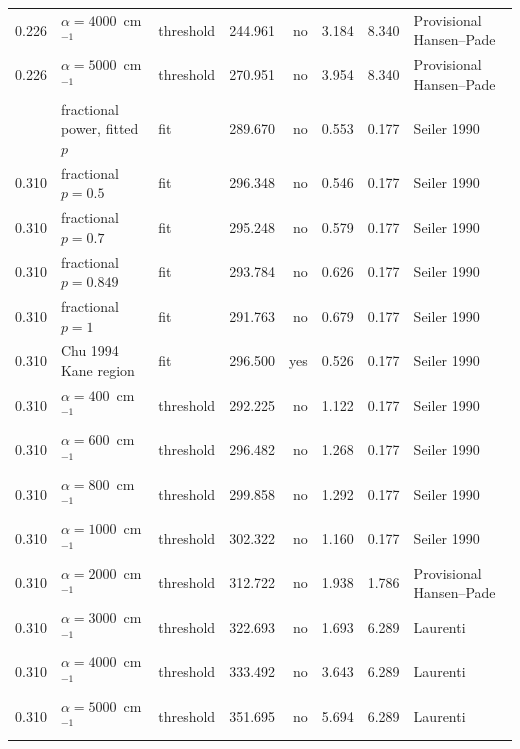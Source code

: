 \begin{landscape}
\begin{longtable}{@{}rp{1.70in}p{0.65in}rrrrp{1.50in}@{}}
0.226 & $\alpha=4000$~cm$^{-1}$ & threshold & 244.961 & no & 3.184 & 8.340 & Provisional Hansen--Pade \\
0.226 & $\alpha=5000$~cm$^{-1}$ & threshold & 270.951 & no & 3.954 & 8.340 & Provisional Hansen--Pade \\
\addlinespace
0.310 & fractional power, fitted $p$ & fit & 289.670 & no & 0.553 & 0.177 & Seiler 1990 \\
0.310 & fractional $p=0.5$ & fit & 296.348 & no & 0.546 & 0.177 & Seiler 1990 \\
0.310 & fractional $p=0.7$ & fit & 295.248 & no & 0.579 & 0.177 & Seiler 1990 \\
0.310 & fractional $p=0.849$ & fit & 293.784 & no & 0.626 & 0.177 & Seiler 1990 \\
0.310 & fractional $p=1$ & fit & 291.763 & no & 0.679 & 0.177 & Seiler 1990 \\
0.310 & Chu 1994 Kane region & fit & 296.500 & yes & 0.526 & 0.177 & Seiler 1990 \\
0.310 & $\alpha=400$~cm$^{-1}$ & threshold & 292.225 & no & 1.122 & 0.177 & Seiler 1990 \\
0.310 & $\alpha=600$~cm$^{-1}$ & threshold & 296.482 & no & 1.268 & 0.177 & Seiler 1990 \\
0.310 & $\alpha=800$~cm$^{-1}$ & threshold & 299.858 & no & 1.292 & 0.177 & Seiler 1990 \\
0.310 & $\alpha=1000$~cm$^{-1}$ & threshold & 302.322 & no & 1.160 & 0.177 & Seiler 1990 \\
0.310 & $\alpha=2000$~cm$^{-1}$ & threshold & 312.722 & no & 1.938 & 1.786 & Provisional Hansen--Pade \\
0.310 & $\alpha=3000$~cm$^{-1}$ & threshold & 322.693 & no & 1.693 & 6.289 & Laurenti \\
0.310 & $\alpha=4000$~cm$^{-1}$ & threshold & 333.492 & no & 3.643 & 6.289 & Laurenti \\
0.310 & $\alpha=5000$~cm$^{-1}$ & threshold & 351.695 & no & 5.694 & 6.289 & Laurenti \\
\end{longtable}
\endgroup
\end{landscape}
